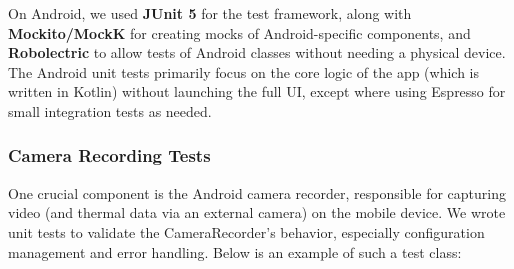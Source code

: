 \documentclass[11pt,a4paper]{report}
\begin{document}
On Android, we used \textbf{JUnit 5} for the test framework, along with
\textbf{Mockito/MockK} for creating mocks of Android-specific components, and
\textbf{Robolectric} to allow tests of Android classes without needing a
physical device. The Android unit tests primarily focus on the core
logic of the app (which is written in Kotlin) without launching the full
UI, except where using Espresso for small integration tests as needed.

\subsubsection{Camera Recording Tests}

One crucial component is the Android camera recorder, responsible for
capturing video (and thermal data via an external camera) on the mobile
device. We wrote unit tests to validate the CameraRecorder's behavior,
especially configuration management and error handling. Below is an
example of such a test class:
\end{document}
